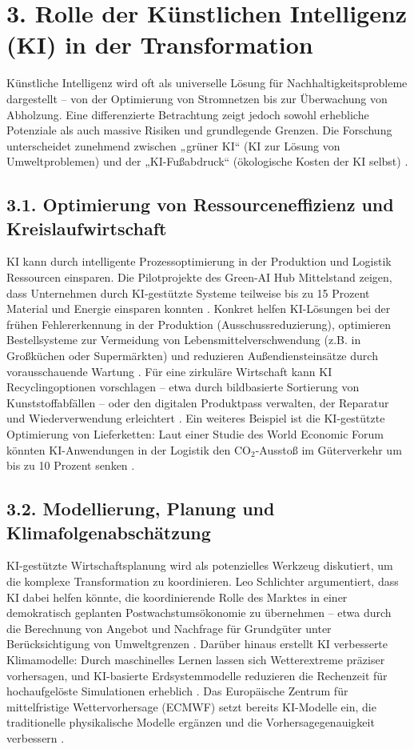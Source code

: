 \documentclass[12pt, a4paper]{article}
\begin{document}
	\section*{3. Rolle der Künstlichen Intelligenz (KI) in der Transformation}
	
	Künstliche Intelligenz wird oft als universelle Lösung für Nachhaltigkeitsprobleme
	dargestellt – von der Optimierung von Stromnetzen bis zur Überwachung von
	Abholzung. Eine differenzierte Betrachtung zeigt jedoch sowohl erhebliche Potenziale
	als auch massive Risiken und grundlegende Grenzen. Die Forschung unterscheidet
	zunehmend zwischen „grüner KI“ (KI zur Lösung von Umweltproblemen) und der „KI-Fußabdruck“
	(ökologische Kosten der KI selbst) \cite{vinuesa2020}.
	
	\subsection*{3.1. Optimierung von Ressourceneffizienz und Kreislaufwirtschaft}
	KI kann durch intelligente Prozessoptimierung in der Produktion und Logistik
	Ressourcen einsparen. Die Pilotprojekte des Green-AI Hub Mittelstand zeigen, dass
	Unternehmen durch KI-gestützte Systeme teilweise bis zu 15 Prozent Material und
	Energie einsparen konnten \cite{greenai2025}. Konkret helfen KI-Lösungen bei der
	frühen Fehlererkennung in der Produktion (Ausschussreduzierung), optimieren
	Bestellsysteme zur Vermeidung von Lebensmittelverschwendung (z.B. in Großküchen oder
	Supermärkten) und reduzieren Außendiensteinsätze durch vorausschauende Wartung
	\cite{greenai2025}. Für eine zirkuläre Wirtschaft kann KI Recyclingoptionen
	vorschlagen – etwa durch bildbasierte Sortierung von Kunststoffabfällen – oder den
	digitalen Produktpass verwalten, der Reparatur und Wiederverwendung erleichtert
	\cite{greenai2025b}. Ein weiteres Beispiel ist die KI-gestützte Optimierung von
	Lieferketten: Laut einer Studie des World Economic Forum könnten KI-Anwendungen in
	der Logistik den CO$_2$-Ausstoß im Güterverkehr um bis zu 10 Prozent senken
	\cite{wef2024}.
	
	\subsection*{3.2. Modellierung, Planung und Klimafolgenabschätzung}
	KI-gestützte Wirtschaftsplanung wird als potenzielles Werkzeug diskutiert, um die
	komplexe Transformation zu koordinieren. Leo Schlichter argumentiert, dass KI dabei
	helfen könnte, die koordinierende Rolle des Marktes in einer demokratisch geplanten
	Postwachstumsökonomie zu übernehmen – etwa durch die Berechnung von Angebot und
	Nachfrage für Grundgüter unter Berücksichtigung von Umweltgrenzen \cite{postwachstumKI}.
	Darüber hinaus erstellt KI verbesserte Klimamodelle: Durch maschinelles Lernen lassen
	sich Wetterextreme präziser vorhersagen, und KI-basierte Erdsystemmodelle reduzieren
	die Rechenzeit für hochaufgelöste Simulationen erheblich \cite{ki-klimamodell2026}.
	Das Europäische Zentrum für mittelfristige Wettervorhersage (ECMWF) setzt bereits
	KI-Modelle ein, die traditionelle physikalische Modelle ergänzen und die
	Vorhersagegenauigkeit verbessern \cite{ecmwf2025}.
	
\end{document}
